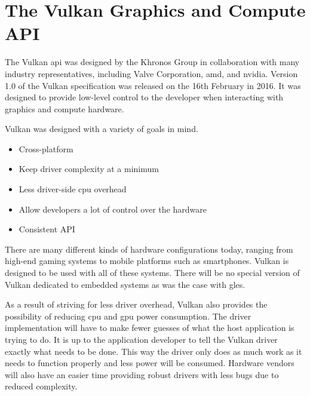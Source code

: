 

  \section{The Vulkan Graphics and Compute API}

    The Vulkan \gls{api} was designed by the Khronos Group in collaboration with many industry representatives, including Valve Corporation, \gls{amd}, and \gls{nvidia}.
    Version 1.0 of the Vulkan specification was released on the 16th February in 2016.
    It was designed to provide low-level control to the developer when interacting with graphics and compute hardware.

    Vulkan was designed with a variety of goals in mind.

    \begin{itemize}
      \item Cross-platform
      \item Keep driver complexity at a minimum
      \item Less driver-side \gls{cpu} overhead
      \item Allow developers a lot of control over the hardware
      \item Consistent API
    \end{itemize}

    There are many different kinds of hardware configurations today, ranging from high-end gaming systems to mobile platforms such as smartphones.
    Vulkan is designed to be used with all of these systems.
    There will be no special version of Vulkan dedicated to embedded systems as was the case with \gls{gles}.

    As a result of striving for less driver overhead, Vulkan also provides the possibility of reducing \gls{cpu} and \gls{gpu} power consumption.
    The driver implementation will have to make fewer guesses of what the host application is trying to do.
    It is up to the application developer to tell the Vulkan driver exactly what needs to be done.
    This way the driver only does as much work as it needs to function properly and less power will be consumed.
    Hardware vendors will also have an easier time providing robust drivers with less bugs due to reduced complexity.

